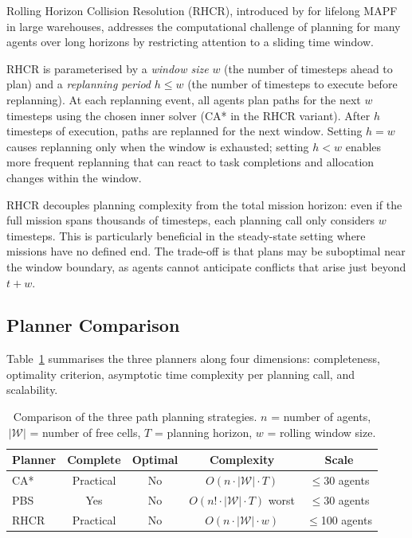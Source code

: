 Rolling Horizon Collision Resolution (RHCR), introduced by
\citet{li2021lifelong} for lifelong MAPF in large warehouses, addresses the
computational challenge of planning for many agents over long horizons by
restricting attention to a sliding time window.

RHCR is parameterised by a \emph{window size} $w$ (the number of timesteps
ahead to plan) and a \emph{replanning period} $h \leq w$ (the number of
timesteps to execute before replanning).
At each replanning event, all agents plan paths for the next $w$ timesteps
using the chosen inner solver (CA* in the RHCR variant).
After $h$ timesteps of execution, paths are replanned for the next window.
Setting $h = w$ causes replanning only when the window is exhausted; setting
$h < w$ enables more frequent replanning that can react to task completions
and allocation changes within the window.

RHCR decouples planning complexity from the total mission horizon: even if the
full mission spans thousands of timesteps, each planning call only considers
$w$ timesteps.
This is particularly beneficial in the steady-state setting where missions have
no defined end.
The trade-off is that plans may be suboptimal near the window boundary, as
agents cannot anticipate conflicts that arise just beyond $t + w$.


\subsection{Planner Comparison}
\label{subsec:method_planner_comparison}

Table~\ref{tab:planner_comparison} summarises the three planners along four
dimensions: completeness, optimality criterion, asymptotic time complexity per
planning call, and scalability.

\begin{table}[htbp]
  \centering
  \caption{Comparison of the three path planning strategies.
           $n$ = number of agents, $|\mathcal{W}|$ = number of free cells,
           $T$ = planning horizon, $w$ = rolling window size.}
  \label{tab:planner_comparison}
  \small
  \begin{tabular}{lcccc}
    \toprule
    \textbf{Planner} & \textbf{Complete} & \textbf{Optimal} &
    \textbf{Complexity} & \textbf{Scale} \\
    \midrule
    CA*   & Practical & No & $O(n \cdot |\mathcal{W}| \cdot T)$ & $\leq$30 agents \\
    PBS   & Yes       & No & $O(n! \cdot |\mathcal{W}| \cdot T)$ worst & $\leq$30 agents \\
    RHCR  & Practical & No & $O(n \cdot |\mathcal{W}| \cdot w)$ & $\leq$100 agents \\
    \bottomrule
  \end{tabular}
\end{table}

